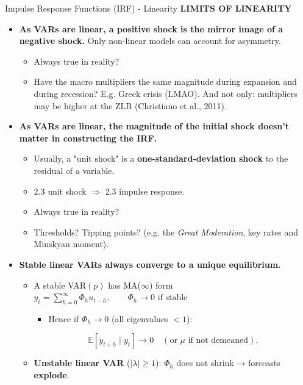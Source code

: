 \documentclass{beamer}
\begin{document}
\begin{frame}{Impulse Response Functions (IRF) - Linearity}
\textbf{LIMITS OF LINEARITY}
\scriptsize
\smallskip
\begin{itemize}
    \item \textbf{As VARs are linear, a positive shock is the mirror image of a negative shock. }Only non-linear models can account for asymmetry.
    \begin{itemize}
    \scriptsize
        \item Always true in reality? \pause
        \item  Have the macro multipliers the same magnitude during expansion and during recession? E.g. Greek crisis (LMAO). And not only: multipliers may be higher at the ZLB (Christiano et al., 2011).
    \end{itemize}
    \item \textbf{As VARs are linear, the magnitude of the initial shock doesn’t matter in constructing the IRF.}
    \begin{itemize}
    \scriptsize
        \item Usually, a "unit shock" is a \textbf{one-standard-deviation shock} to the residual of a variable.
        \item 2.3 unit shock $\Longrightarrow$ 2.3 impulse response. 
        \item Always true in reality? \pause
        \item Thresholds? Tipping points? (e.g. the \textit{Great Moderation}, key rates and Minskyan moment). 
    \end{itemize}
     \pause
    \item \textbf{Stable linear VARs always converge to a unique equilibrium.}
    \begin{itemize}
    \scriptsize
        \item A stable VAR$(p)$ has MA($\infty$) form $y_t = \sum_{h=0}^{\infty} \Phi_h u_{t-h},\qquad \Phi_h \to 0 \text{ if stable}$
    \begin{itemize}
    \scriptsize
\item Hence if $\Phi_h \to 0$ (all eigenvalues $<1$):
    \end{itemize}
\[
\mathbb{E}[y_{t+h}\mid y_t] \to 0 \quad
(\text{or }\mu \text{ if not demeaned}).
 \]
        \item \textbf{Unstable linear VAR} ($|\lambda|\ge1$): $\Phi_h$ does not shrink → forecasts \textbf{explode}.
    \end{itemize}
\end{itemize}

\end{frame}
\end{document}
